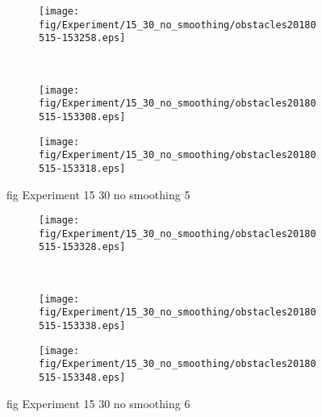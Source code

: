 \begin{figure}[H]
	\centering
	\begin{subfigure}[b]{0.45\textwidth}
		\texttt{[image: fig/Experiment/15\_30\_no\_smoothing/obstacles20180515-153258.eps]}
		\caption{}
		\label{fig:Experiment:15_30_no_smoothing:obstacles20180515-153258}
	\end{subfigure}
	~
	\begin{subfigure}[b]{0.45\textwidth}
		\texttt{[image: fig/Experiment/15\_30\_no\_smoothing/obstacles20180515-153308.eps]}
		\caption{}
		\label{fig:Experiment:15_30_no_smoothing:obstacles20180515-153308}
	\end{subfigure}

	\begin{subfigure}[b]{0.45\textwidth}
		\texttt{[image: fig/Experiment/15\_30\_no\_smoothing/obstacles20180515-153318.eps]}
		\caption{}
		\label{fig:Experiment:15_30_no_smoothing:obstacles20180515-153318}
	\end{subfigure}
	\caption{fig Experiment 15 30 no smoothing 5}
	\label{fig:Experiment:15_30_no_smoothing:5}
\end{figure}

\begin{figure}[H]
	\centering
	\begin{subfigure}[b]{0.45\textwidth}
		\texttt{[image: fig/Experiment/15\_30\_no\_smoothing/obstacles20180515-153328.eps]}
		\caption{}
		\label{fig:Experiment:15_30_no_smoothing:obstacles20180515-153328}
	\end{subfigure}
	~
	\begin{subfigure}[b]{0.45\textwidth}
		\texttt{[image: fig/Experiment/15\_30\_no\_smoothing/obstacles20180515-153338.eps]}
		\caption{}
		\label{fig:Experiment:15_30_no_smoothing:obstacles20180515-153338}
	\end{subfigure}

	\begin{subfigure}[b]{0.45\textwidth}
		\texttt{[image: fig/Experiment/15\_30\_no\_smoothing/obstacles20180515-153348.eps]}
		\caption{}
		\label{fig:Experiment:15_30_no_smoothing:obstacles20180515-153348}
	\end{subfigure}
	\caption{fig Experiment 15 30 no smoothing 6}
	\label{fig:Experiment:15_30_no_smoothing:6}
\end{figure}

